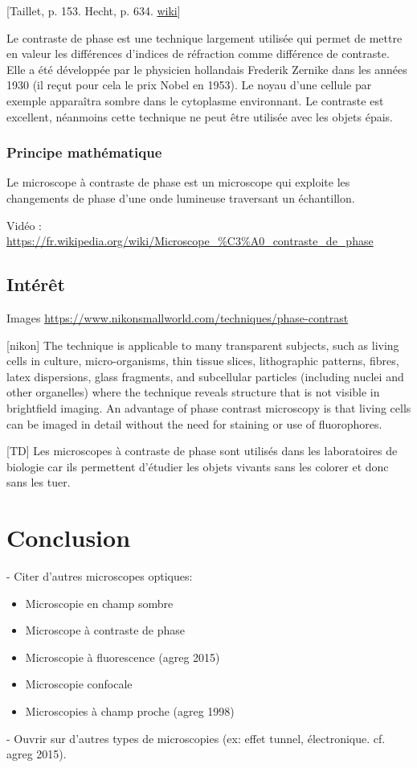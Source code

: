 \documentclass[11pt]{report}
\numberwithin{figure}{section}
\numberwithin{equation}{section}
\numberwithin{table}{section}
\newcommand{\1}{\boldsymbol{1}}
\begin{document}
[Taillet, p. 153. Hecht, p. 634. \href{https://fr.wikipedia.org/wiki/Microscope_%C3%A0_contraste_de_phase}{wiki}]

Le contraste de phase est une technique largement utilisée qui permet de mettre en valeur les différences d'indices de réfraction comme différence de contraste. Elle a été développée par le physicien hollandais Frederik Zernike dans les années 1930 (il reçut pour cela le prix Nobel en 1953). Le noyau d'une cellule par exemple apparaîtra sombre dans le cytoplasme environnant. Le contraste est excellent, néanmoins cette technique ne peut être utilisée avec les objets épais.

\subsubsection{Principe mathématique}

Le microscope à contraste de phase est un microscope qui exploite les changements de phase d'une onde lumineuse traversant un échantillon.

Vidéo : \url{https://fr.wikipedia.org/wiki/Microscope_%C3%A0_contraste_de_phase}

\subsection{Intérêt}

Images \url{https://www.nikonsmallworld.com/techniques/phase-contrast}

[nikon] The technique is applicable to many transparent subjects, such as living cells in culture, micro-organisms, thin tissue slices, lithographic patterns, fibres, latex dispersions, glass fragments, and subcellular particles (including nuclei and other organelles) where the technique reveals structure that is not visible in brightfield imaging. An advantage of phase contrast microscopy is that living cells can be imaged in detail without the need for staining or use of fluorophores.

[TD] Les microscopes à contraste de phase sont utilisés dans les laboratoires de biologie car ils permettent d’étudier les objets vivants sans les colorer et donc sans les tuer.


\section*{Conclusion}

\noindent
- Citer d'autres microscopes optiques:
\begin{itemize}
\item Microscopie en champ sombre
\item Microscope à contraste de phase
\item Microscopie à fluorescence (agreg 2015)
\item Microscopie confocale
\item Microscopies à champ proche (agreg 1998)
\end{itemize}
- Ouvrir sur d'autres types de microscopies (ex: effet tunnel, électronique. cf. agreg 2015).
\end{document}
